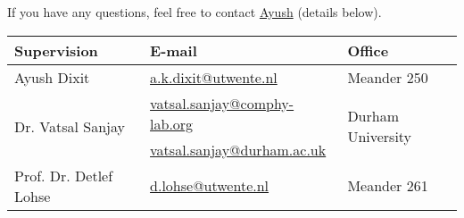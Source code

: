 \documentclass[a4paper,10pt]{article}
\begin{document}
If you have any questions, feel free to contact \href{mailto:a.k.dixit@utwente.nl}{Ayush} (details below).
\begin{center}
\begin{tabular}{|l|l|l|}
\hline \textbf{Supervision} & \textbf{E-mail} & \textbf{Office} \\
\hline Ayush Dixit & \href{mailto:a.k.dixit@utwente.nl}{a.k.dixit@utwente.nl} & Meander 250 \\
\hline \multirow{2}{*}{Dr. Vatsal Sanjay} & \href{mailto:vatsal.sanjay@comphy-lab.org}{vatsal.sanjay@comphy-lab.org} & \multirow{2}{*}{Durham University} \\
& \href{mailto:vatsal.sanjay@durham.ac.uk}{vatsal.sanjay@durham.ac.uk} & \\
\hline Prof. Dr. Detlef Lohse & \href{mailto:d.lohse@utwente.nl}{d.lohse@utwente.nl} & Meander 261  \\
\hline
\end{tabular}
\end{center}

\printbibliography
\end{document}
